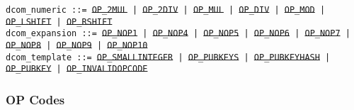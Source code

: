 \documentclass{article}
\begin{document}
\noindent \hangindent=0.7cm
\texttt{dcom\_numeric ::=
  \sout{OP\_2MUL} | \sout{OP\_2DIV} | \sout{OP\_MUL} |
  \sout{OP\_DIV} | \sout{OP\_MOD} | \sout{OP\_LSHIFT} | \sout{OP\_RSHIFT}} \\

\noindent \hangindent=0.7cm
\texttt{dcom\_expansion ::=
  \sout{OP\_NOP1} | \sout{OP\_NOP4} | \sout{OP\_NOP5} |
  \sout{OP\_NOP6} | \sout{OP\_NOP7} | \sout{OP\_NOP8} | \sout{OP\_NOP9} |
  \sout{OP\_NOP10}} \\

\noindent \hangindent=0.7cm
\texttt{dcom\_template ::=
  \sout{OP\_SMALLINTEGER} | \sout{OP\_PUBKEYS} | \sout{OP\_PUBKEYHASH} |
  \sout{OP\_PUBKEY} | \sout{OP\_INVALIDOPCODE}}


\pagebreak

\subsubsection{OP Codes}
\end{document}
